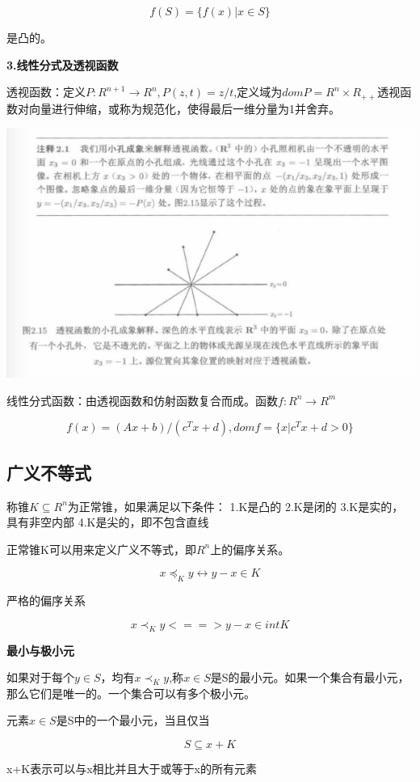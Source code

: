 \documentclass{ctexart}
\begin{document}
	\[f(S)=\{f(x)|x\in S\}\]

	是凸的。
	
	\textbf{3.线性分式及透视函数}
	
	透视函数：定义\(P:R^{n+1} \to R^n, P(z,t)=z/t\),定义域为\(domP=R^n\times R_{++}\)透视函数对向量进行伸缩，或称为规范化，使得最后一维分量为1并舍弃。
	
	\includegraphics[width=1\linewidth]{pic/pic2_15}
	
	线性分式函数：由透视函数和仿射函数复合而成。函数\(f:R^n \to R^m\)
	
	\[f(x)=(Ax+b)/(c^Tx+d), dom f=\{x|c^Tx+d > 0\}\]
	
	\subsection{广义不等式}
	
	称锥\(K \subseteq R^n\)为正常锥，如果满足以下条件：
	1.K是凸的
	2.K是闭的
	3.K是实的，具有非空内部
	4.K是尖的，即不包含直线
	
	正常锥K可以用来定义广义不等式，即\(R^n\)上的偏序关系。
	
	\[x \preceq_K y \leftrightarrow y-x \in K\]
	
	严格的偏序关系
	
	\[x \prec_K y <==> y-x \in int K\]
	
	\textbf{最小与极小元}
	
	如果对于每个\(y \in S\)，均有\(x \prec_K y\),称\(x \in S\)是S的最小元。如果一个集合有最小元，那么它们是唯一的。一个集合可以有多个极小元。
	
	元素\(x \in S\)是S中的一个最小元，当且仅当
	
	\[S \subseteq x+K\]
	
	x+K表示可以与x相比并且大于或等于x的所有元素
	
\end{document}
